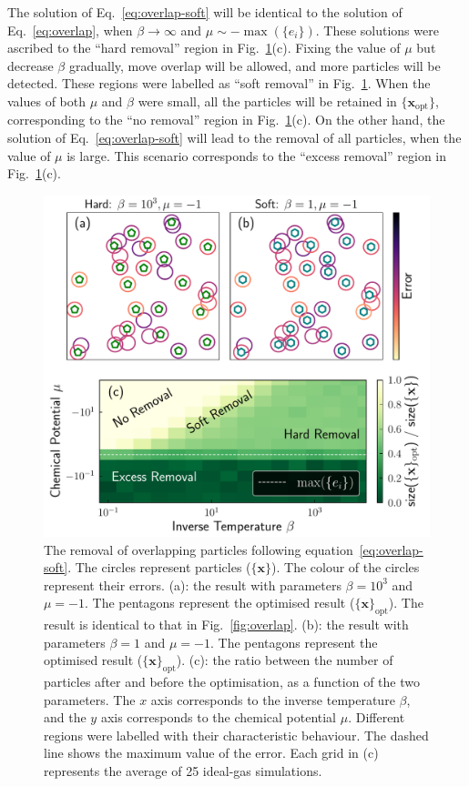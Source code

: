 \documentclass[11pt,twoside]{report}
\begin{document}
The solution of Eq.~\ref{eq:overlap-soft} will be identical to the solution of Eq.~\ref{eq:overlap}, when $\beta \rightarrow \infty$ and $\mu \sim -\max(\{ e_i \})$. These solutions were ascribed to the ``hard removal'' region in Fig.~\ref{fig:overlap-soft}(c). Fixing the value of $\mu$ but decrease $\beta$ gradually, move overlap will be allowed, and more particles will be detected. These regions were labelled as ``soft removal'' in Fig.~\ref{fig:overlap-soft}. When the values of both $\mu$ and $\beta$ were small, all the particles will be retained in $\{\mathbf{x}_\mathrm{opt}\}$, corresponding to the ``no removal'' region in Fig.~\ref{fig:overlap-soft}(c). On the other hand, the solution of Eq.~\ref{eq:overlap-soft} will lead to the removal of all particles, when the value of $\mu$ is large. This scenario corresponds to the ``excess removal'' region in Fig.~\ref{fig:overlap-soft}(c).


\begin{figure}
  \includegraphics[width=\linewidth]{overlap-soft}
  \caption[Removing the overlap particles with soft constraint]{
  The removal of overlapping particles following equation~\ref{eq:overlap-soft}. The circles represent particles ($\{\mathbf{x}\}$). The colour of the circles represent their errors.
  (a): the result with parameters $\beta=10^3$ and $\mu=-1$. The pentagons represent the optimised result ($\{ \mathbf{x} \}_\textrm{opt}$). The result is identical to that in Fig.~\ref{fig:overlap}.
  (b): the result with parameters $\beta=1$ and $\mu=-1$. The pentagons represent the optimised result ($\{ \mathbf{x} \}_\textrm{opt}$).
  (c): the ratio between the number of particles after and before the optimisation, as a function of the two parameters. The $x$ axis corresponds to the inverse temperature $\beta$, and the $y$ axis corresponds to the chemical potential $\mu$. Different regions were labelled with their characteristic behaviour. The dashed line shows the maximum value of the error. Each grid in (c) represents the average of 25 ideal-gas simulations.
  }
  \label{fig:overlap-soft}
\end{figure}
\end{document}
